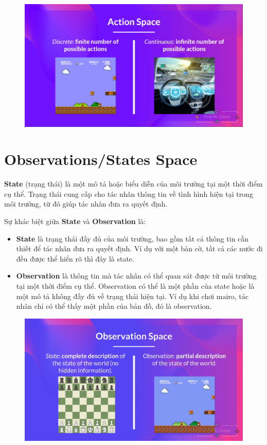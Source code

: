 \documentclass[final,letterpaper,twoside,12pt]{report}
\begin{document}
\begin{figure}[h]
	\begin{center}
		\includegraphics[width=1\textwidth]{Action Space.jpg}
	\end{center}
\end{figure}

\section{Observations/States Space}
\textbf{State} (trạng thái) là một mô tả hoặc biểu diễn của môi trường tại một thời điểm cụ thể. Trạng thái cung cấp cho tác nhân thông tin về tình hình hiện tại trong môi trường, từ đó giúp tác nhân đưa ra quyết định.

Sự khác biệt giữa \textbf{State} và \textbf{Observation} là:
\begin{itemize}
	\item \textbf{State} là trạng thái đầy đủ của môi trường, bao gồm tất cả thông tin cần thiết để tác nhân đưa ra quyết định. Ví dụ với một bàn cờ, tất cả các nước đi đều được thể hiển rõ thì đây là state.
	\item \textbf{Observation} là thông tin mà tác nhân có thể quan sát được từ môi trường tại một thời điểm cụ thể. Observation có thể là một phần của state hoặc là một mô tả không đầy đủ về trạng thái hiện tại. Ví dụ khi chơi mairo, tác nhân chỉ có thể thấy một phần của bản đồ, đó là observation.
\end{itemize}

\begin{figure}[h]
	\begin{center}
		\includegraphics[width=1\textwidth]{Observations_States Space.jpg}
	\end{center}
\end{figure}
\end{document}
